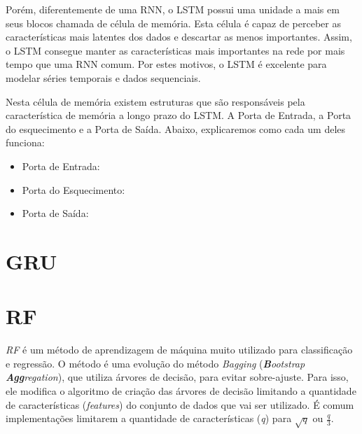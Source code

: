 
Porém, diferentemente de uma \acrshort{RNN}, o LSTM possui uma unidade a mais em seus blocos chamada de célula de memória. Esta célula é capaz de perceber as características mais latentes dos dados e descartar as menos importantes. Assim, o \acrshort{LSTM} consegue manter as características mais importantes na rede por mais tempo que uma \acrshort{RNN} comum. Por estes motivos, o \acrshort{LSTM} é excelente para modelar séries temporais e dados sequenciais.

Nesta célula de memória existem estruturas que são responsáveis pela característica de memória a longo prazo do \acrshort{LSTM}. A Porta de Entrada, a Porta do esquecimento e a Porta de Saída. Abaixo, explicaremos como cada um deles funciona:

\begin{itemize}
  \item Porta de Entrada: 
  \item Porta do Esquecimento: 
  \item Porta de Saída:
\end{itemize}


\section{\acrfull{GRU}}

\section{\acrfull{RF}}



\textit{\acrshort{RF}} é um método de aprendizagem de máquina muito utilizado para classificação e regressão. O método é uma evolução do método \textit{Bagging} (\textit{\textbf{B}ootstrap \textbf{Agg}regation}), que utiliza árvores de decisão, para evitar sobre-ajuste. Para isso, ele modifica o algoritmo de criação das árvores de decisão limitando a quantidade de características (\textit{features}) do conjunto de dados que vai ser utilizado. É comum implementações limitarem a quantidade de características (\textit{q}) para $ \sqrt{q} $ ou $ \frac{q}{3} $.

